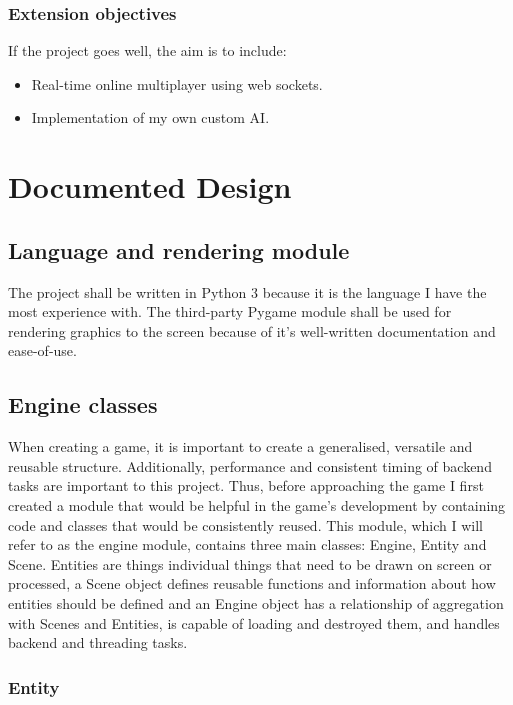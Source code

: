 \documentclass{report}
\begin{document}
\subsection{Extension objectives}

If the project goes well, the aim is to include:
\begin{itemize}
    \renewcommand\labelitemi{--}
    \item Real-time online multiplayer using web sockets.
    \item Implementation of my own custom AI.
\end{itemize} 

\chapter{Documented Design}

\section{Language and rendering module}

The project shall be written in Python 3 because it is the language I have the most experience with. The third-party Pygame module shall be used for rendering graphics to the screen because of it's well-written documentation and ease-of-use.

\section{Engine classes}

When creating a game, it is important to create a generalised, versatile and reusable structure. Additionally, performance and consistent timing of backend tasks are important to this project. Thus, before approaching the game I first created a module that would be helpful in the game's development by containing code and classes that would be consistently reused. This module, which I will refer to as the engine module, contains three main classes: Engine, Entity and Scene. Entities are things individual things that need to be drawn on screen or processed, a Scene object defines reusable functions and information about how entities should be defined and an Engine object has a relationship of aggregation with Scenes and Entities, is capable of loading and destroyed them, and handles backend and threading tasks.

\subsection{Entity}
\end{document}
